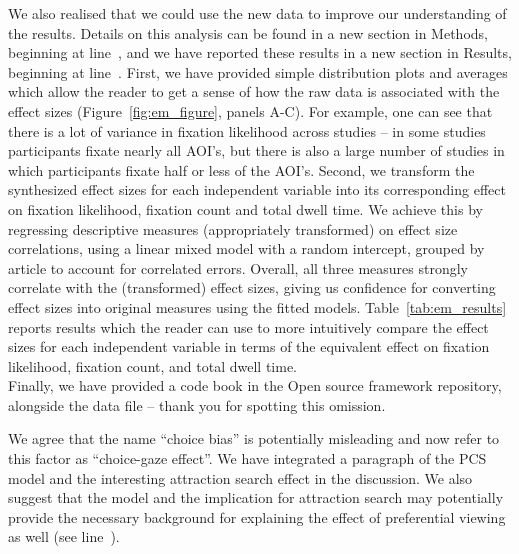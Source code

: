 We also realised that we could use the new data to improve our understanding of the results. Details on this analysis can be found in a new section in Methods, beginning at line~, and we have reported these results in a new section in Results, beginning at line~.
First, we have provided simple distribution plots and averages which allow the reader to get a sense of how the raw data is associated with the effect sizes (Figure~\ref{fig:em_figure}, panels A-C). For example, one can see that there is a lot of variance in fixation likelihood across studies -- in some studies participants fixate nearly all AOI's, but there is also a large number of studies in which participants fixate half or less of the AOI's. Second, we transform the synthesized effect sizes for each independent variable into its corresponding effect on fixation likelihood, fixation count and total dwell time. We achieve this by regressing descriptive measures (appropriately transformed) on effect size correlations, using a linear mixed model with a random intercept, grouped by article to account for correlated errors. Overall, all three measures strongly correlate with the (transformed) effect sizes, giving us confidence for converting effect sizes into original measures using the fitted models. Table~\ref{tab:em_results} reports results which the reader can use to more intuitively compare the effect sizes for each independent variable in terms of the equivalent effect on fixation likelihood, fixation count, and total dwell time.\\

Finally, we have provided a code book in the Open source framework repository, alongside the data file -- thank you for spotting this omission.



We agree that the name ``choice bias'' is potentially misleading and now refer to this factor as ``choice-gaze effect''. We have integrated a paragraph of the PCS model and the interesting attraction search effect in the discussion. We also suggest that the model and the implication for attraction search may potentially provide the necessary background for explaining the effect of preferential viewing  as well (see line~).  

